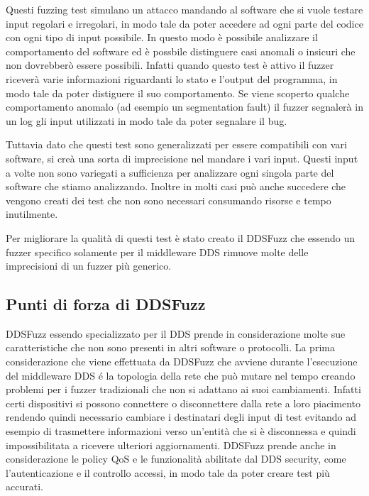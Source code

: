 Questi fuzzing test simulano un attacco mandando al software
che si vuole testare input regolari e irregolari, 
in modo tale da poter 
accedere ad ogni parte del codice con ogni tipo di input possibile.
In questo modo è possibile analizzare il comportamento del software
ed è possbile distinguere casi anomali o insicuri che non dovrebberò
essere possibili. Infatti quando questo test è attivo il fuzzer riceverà
varie informazioni riguardanti lo stato e l'output del programma, in 
modo tale da poter distiguere il suo comportamento. Se viene scoperto
qualche comportamento anomalo (ad esempio un segmentation fault) il 
fuzzer segnalerà in un log gli input utilizzati in modo tale da poter 
segnalare il bug.

Tuttavia dato che questi test sono generalizzati per essere compatibili
con vari software, si creà una sorta di imprecisione nel mandare i vari 
input. Questi input a volte non sono variegati a sufficienza 
per analizzare ogni singola parte del software che stiamo analizzando.
Inoltre in molti casi può anche succedere che vengono creati
dei test che non sono necessari consumando risorse e tempo inutilmente.

Per migliorare la qualità di questi test è stato 
creato il DDSFuzz che essendo un fuzzer specifico solamente per 
il middleware DDS rimuove molte delle imprecisioni di un fuzzer 
più generico.

\subsection{Punti di forza di DDSFuzz}
DDSFuzz essendo specializzato per il DDS prende in considerazione 
molte sue caratteristiche che non sono presenti in altri software
o protocolli. La prima considerazione che viene 
effettuata da DDSFuzz che avviene durante l'esecuzione del middleware DDS é
la topologia della rete che può mutare nel tempo creando problemi per i
fuzzer tradizionali che non si adattano ai suoi cambiamenti. Infatti certi
dispositivi si possono connettere o disconnettere dalla rete a loro 
piacimento rendendo quindi necessario cambiare i destinatari 
degli input di test 
evitando ad esempio di trasmettere informazioni verso un'entità 
che si è disconnessa e quindi impossibilitata a ricevere ulteriori
aggiornamenti. DDSFuzz prende anche in considerazione le
policy QoS e 
le funzionalità abilitate dal DDS security, come
l'autenticazione e il controllo accessi, in modo tale da
poter creare test più accurati. 

